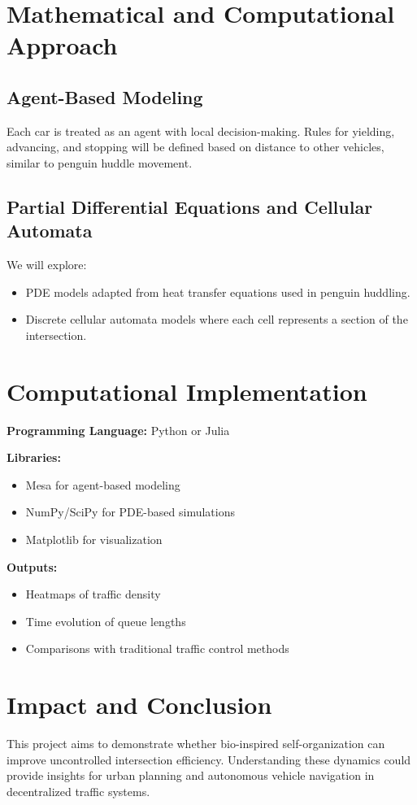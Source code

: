 \documentclass[10pt]{article}
\begin{document}
\section*{Mathematical and Computational Approach}

\subsection*{Agent-Based Modeling}
Each car is treated as an agent with local decision-making. Rules for yielding, advancing, and stopping will be defined based on distance to other vehicles, similar to penguin huddle movement.

\subsection*{Partial Differential Equations and Cellular Automata}
We will explore:
\begin{itemize}
    \item PDE models adapted from heat transfer equations used in penguin huddling.
    \item Discrete cellular automata models where each cell represents a section of the intersection.
\end{itemize}

\section*{Computational Implementation}
\textbf{Programming Language:} Python or Julia

\textbf{Libraries:}
\begin{itemize}
    \item Mesa for agent-based modeling
    \item NumPy/SciPy for PDE-based simulations
    \item Matplotlib for visualization
\end{itemize}

\textbf{Outputs:}
\begin{itemize}
    \item Heatmaps of traffic density
    \item Time evolution of queue lengths
    \item Comparisons with traditional traffic control methods
\end{itemize}

\section*{Impact and Conclusion}
This project aims to demonstrate whether bio-inspired self-organization can improve uncontrolled intersection efficiency. Understanding these dynamics could provide insights for urban planning and autonomous vehicle navigation in decentralized traffic systems.
\end{document}

